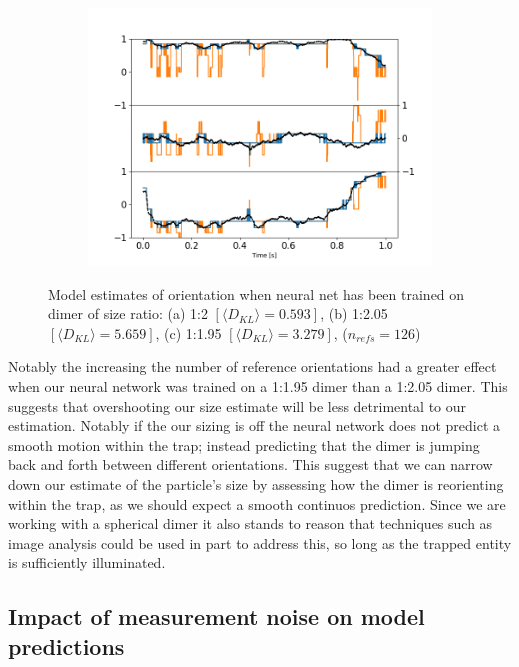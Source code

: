 \begin{figure}[h!]
\begin{subfigure}{0.31\textwidth}
		\includegraphics[width=\textwidth]{fig9c.png}
	\end{subfigure}
	\caption{Model estimates of orientation when neural net has 
		been trained on dimer of size ratio: (a) 1:2 $[\langle D_{KL}\rangle=0.593]$, (b) 1:2.05 $[\langle D_{KL}\rangle
		=5.659]$, (c) 1:1.95 $[\langle D_{KL}\rangle=3.279]$, 
		($n_{refs} = 126$)}
	\label{fig:refs}
\end{figure}

Notably the increasing the number of reference orientations had a greater effect when our neural network was trained on a 1:1.95 dimer than a 1:2.05 dimer. This suggests that overshooting our size estimate will be less detrimental to our estimation. Notably if the our sizing is off the neural network does not predict a smooth motion within the trap; instead predicting that the dimer is jumping back and forth between different orientations. This suggest that we can narrow down our estimate of the particle's size by assessing how the dimer is reorienting within the trap, as we should expect a smooth continuos prediction. Since we are working with a spherical dimer it also stands to reason that techniques such as image analysis could be used in part to address this, so long as the trapped entity is sufficiently illuminated. 
\subsection{Impact of measurement noise on model predictions}
\label{sec:epsilon}

